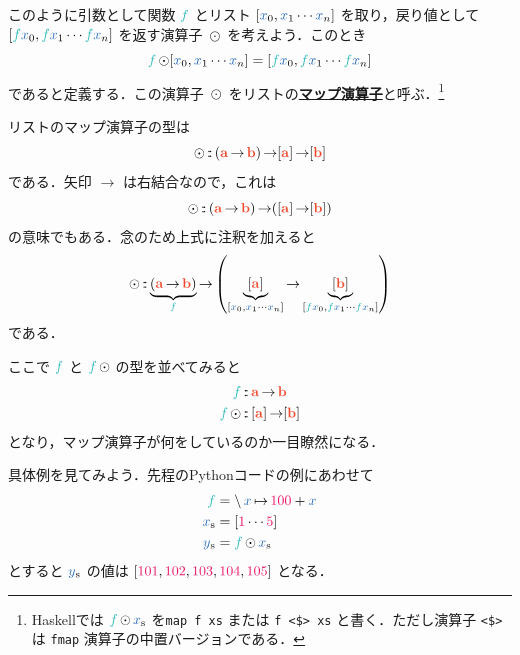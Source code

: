 \documentclass[a5paper,twoside,fleqn,draft]{jsbook}
\newcommand{\TK}[1]{\mask{\textbf{TK:}~#1}{C}}
\def\constantColor{WildStrawberry}
\def\varColor{NavyBlue}
\def\funcColor{BlueGreen}
\def\typeColor{RedOrange}
\newcommand{\programminglanguage}[1]{\textsf{#1}}
\newcommand{\haskell}{\programminglanguage{Haskell}}
\newcommand{\python}{\programminglanguage{Python}}
\newcommand{\keyword}[1]{{\underline{\textbf{#1}}}}
\newcommand{\code}[1]{\texttt{#1}}
\newcommand{\mConstant}[1]{\textcolor{\constantColor}{#1}}
\newcommand{\mOneNumber}{{\mConstant{1}}}
\newcommand{\mFiveNumber}{\mConstant{5}}
\newcommand{\mVar}[1]{\textcolor{\varColor}{#1}}
\newcommand{\mXVar}{\mVar{x}}
\newcommand{\mFunc}[1]{\textcolor{\funcColor}{#1}}
\newcommand{\mFFunc}{{\mFunc{f}}}
\DeclareMathOperator{\mFuncArrow}{\rightarrow}
\DeclareMathOperator{\mIn}{{:\!:}}
\DeclareMathOperator{\mLambda}{\backslash}
\DeclareMathOperator{\mLambdaArrow}{\mapsto}
\DeclareMathOperator{\mMapList}{\odot}
\newcommand{\mType}[1]{\textcolor{\typeColor}{\mathbf{#1}}}
\newcommand{\mA}{\mType{a}}
\newcommand{\mB}{\mType{b}}
\newcommand{\mList}[1]{\mVar{#1}_\mathrm{s}}
\begin{document}
このように引数として関数 $\mFFunc$ とリスト $[\mXVar_0,\mXVar_1\dotsb \mXVar_n]$ を取り，戻り値として $[\mFFunc\mXVar_0,\mFFunc\mXVar_1\dotsb \mFFunc\mXVar_n]$ を返す演算子 $\mMapList$ を考えよう．このとき
\begin{equation}
  \mFFunc\mMapList[\mXVar_0,\mXVar_1\dotsb \mXVar_n]
  =[\mFFunc\mXVar_0,\mFFunc\mXVar_1\dotsb \mFFunc\mXVar_n]
\end{equation}
であると定義する．この演算子 $\mMapList$ をリストの\keyword{マップ演算子}と呼ぶ．\footnote{\haskell では $\mFFunc\mMapList\mList{x}$ を\code{map f xs} または \code{f <\$> xs} と書く．ただし演算子 \code{<\$>} は \code{fmap} 演算子の中置バージョンである．}

リストのマップ演算子の型は
\begin{equation}
  \mMapList
  \mIn{}(\mA\mFuncArrow\mB)\mFuncArrow[\mA]\mFuncArrow[\mB]
\end{equation}
である．矢印 $\mFuncArrow$ は右結合なので，これは
\begin{equation}
  \mMapList
  \mIn{}(\mA\mFuncArrow\mB)\mFuncArrow([\mA]\mFuncArrow[\mB])
\end{equation}
の意味でもある．念のため上式に注釈を加えると
\begin{equation}
  \mMapList
  \mIn\underbrace{\left(\mA\mFuncArrow\mB\right)}_\mFFunc
  \mFuncArrow\left(\underbrace{[\mA]}_{[\mXVar_0,\mXVar_1\dotsb \mXVar_n]}
  \mFuncArrow\underbrace{[\mB]}_{[\mFFunc\mXVar_0,\mFFunc\mXVar_1\dotsb \mFFunc\mXVar_n]}\right)
\end{equation}
である．

ここで $\mFFunc$ と $\mFFunc\mMapList$ の型を並べてみると
\begin{align}
  \mFFunc
  &\mIn\mA\mFuncArrow\mB\\
  \mFFunc\mMapList
  &\mIn{}[\mA]\mFuncArrow[\mB]
\end{align}
となり，マップ演算子が何をしているのか一目瞭然になる．


具体例を見てみよう．先程の\python コードの例にあわせて
\begin{align}
  \mFFunc
  &=\mLambda\mXVar\mLambdaArrow\mConstant{100}+\mXVar\\
  \mList{x}
  &=[\mOneNumber\dotsb\mFiveNumber]\\
  \mList{y}
  &=\mFFunc\mMapList\mList{x}
\end{align}
とすると $\mList{y}$ の値は $[\mConstant{101},\mConstant{102},\mConstant{103},\mConstant{104},\mConstant{105}]$ となる．
\end{document}
